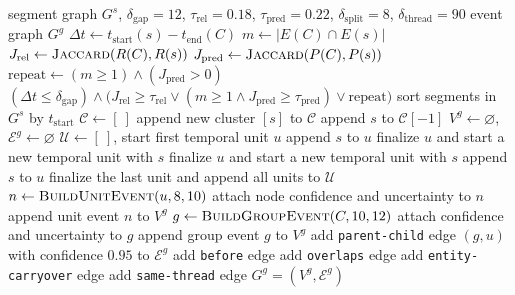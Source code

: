 \documentclass[sigconf, screen, review, anonymous]{acmart}
\begin{document}
\begin{algorithm}[t]
\caption{Stage-3 Global Event Graph Construction}
\label{alg:app-event}
\footnotesize
\begin{algorithmic}[1]
\Require segment graph $G^s$, $\delta_{\mathrm{gap}}=12$, $\tau_{\mathrm{rel}}=0.18$, $\tau_{\mathrm{pred}}=0.22$, $\delta_{\mathrm{split}}=8$, $\delta_{\mathrm{thread}}=90$
\Ensure event graph $G^g$
    \State $\Delta t \gets t_{\mathrm{start}}(s) - t_{\mathrm{end}}(C)$
    \State $m \gets |E(C)\cap E(s)|$
    \State $J_{\mathrm{rel}} \gets \textsc{Jaccard}(R(C), R(s))$
    \State $J_{\mathrm{pred}} \gets \textsc{Jaccard}(P(C), P(s))$
    \State $\mathrm{repeat} \gets (m \ge 1) \land (J_{\mathrm{pred}} > 0)$
    \State \Return $(\Delta t \le \delta_{\mathrm{gap}}) \land \bigl(J_{\mathrm{rel}} \ge \tau_{\mathrm{rel}} \lor (m \ge 1 \land J_{\mathrm{pred}} \ge \tau_{\mathrm{pred}}) \lor \mathrm{repeat}\bigr)$
\EndFunction
\State sort segments in $G^s$ by $t_{\mathrm{start}}$
\State $\mathcal{C} \gets [\ ]$
        \State append new cluster $[s]$ to $\mathcal{C}$
    \Else
        \State append $s$ to $\mathcal{C}[-1]$
    \EndIf
\EndFor
\State $V^g \gets \varnothing$, $\mathcal{E}^g \gets \varnothing$
    \State $\mathcal{U} \gets [\ ]$, start first temporal unit $u$
            \State append $s$ to $u$
            \State finalize $u$ and start a new temporal unit with $s$
            \State finalize $u$ and start a new temporal unit with $s$
        \Else
            \State append $s$ to $u$
        \EndIf
    \EndFor
    \State finalize the last unit and append all units to $\mathcal{U}$
        \State $n \gets \textsc{BuildUnitEvent}(u,8,10)$
        \State attach node confidence and uncertainty to $n$
        \State append unit event $n$ to $V^g$
    \EndFor
        \State $g \gets \textsc{BuildGroupEvent}(C,10,12)$
        \State attach confidence and uncertainty to $g$
        \State append group event $g$ to $V^g$
            \State add \texttt{parent-child} edge $(g,u)$ with confidence $0.95$ to $\mathcal{E}^g$
        \EndFor
    \EndIf
\EndFor
{}
        \State add \texttt{before} edge
    \EndIf
        \State add \texttt{overlaps} edge
    \EndIf
        \State add \texttt{entity-carryover} edge
            \State add \texttt{same-thread} edge
        \EndIf
    \EndIf
\EndFor
\State \Return $G^g=(V^g,\mathcal{E}^g)$
\end{algorithmic}
\end{algorithm}
\end{document}
